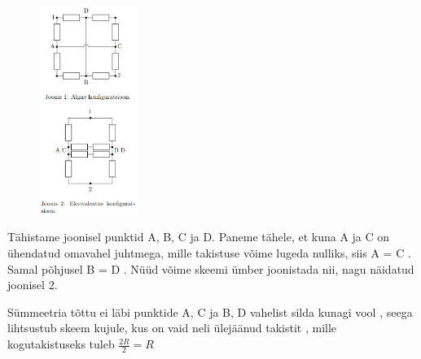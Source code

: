 \solu
\begin{figure}
    \vspace{-30pt}
	\includegraphics[width=0.28\textwidth]{2020-v2g-04-yl.jpg}
	\vspace{-40pt}
\end{figure}
Tähistame joonisel punktid A, B, C
ja D. Paneme tähele, et kuna
A ja C on ühendatud omavahel
juhtmega, mille takistuse võime
lugeda nulliks, siis A = C . Samal
põhjusel B = D . Nüüd võime
skeemi ümber joonistada nii, nagu
näidatud joonisel 2. 

Sümmeetria tõttu ei läbi punktide A, C ja B, D vahelist silda kunagi vool , seega lihtsustub skeem
kujule, kus on vaid neli ülejäänud takistit , mille kogutakistuseks tuleb $\frac{2R}{2} = R$ 
\probend